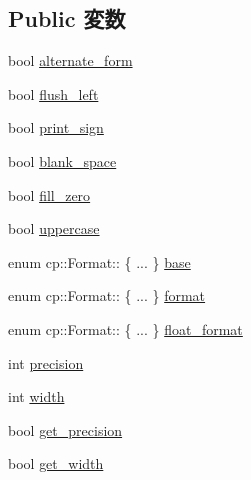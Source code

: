 \subsection*{Public 変数}
\begin{DoxyCompactItemize}
\item 
bool \hyperlink{structcp_1_1Format_a4accc3f9c261319d3776367892e23829}{alternate\_\-form}
\item 
bool \hyperlink{structcp_1_1Format_acc6845b4af267d8ecf7f301c3341ab97}{flush\_\-left}
\item 
bool \hyperlink{structcp_1_1Format_ab7c37fe3cbc5111a30a7b3c23f6cd95d}{print\_\-sign}
\item 
bool \hyperlink{structcp_1_1Format_ac62e0d7e7035e41d8b81591afc662090}{blank\_\-space}
\item 
bool \hyperlink{structcp_1_1Format_aea2b8a71b9111805920b036fc5b7f271}{fill\_\-zero}
\item 
bool \hyperlink{structcp_1_1Format_acf08089b3da2364267676e8d54503bb7}{uppercase}
\item 
enum cp::Format:: \{ ... \}  \hyperlink{structcp_1_1Format_a9a1f58abfd1ab6f831c3377b88ada6ac}{base}
\item 
enum cp::Format:: \{ ... \}  \hyperlink{structcp_1_1Format_a0499fd1abf3b3c756228b2ed6eeb5840}{format}
\item 
enum cp::Format:: \{ ... \}  \hyperlink{structcp_1_1Format_a684c0beba7b4d2c1840dd1ac8c725bd5}{float\_\-format}
\item 
int \hyperlink{structcp_1_1Format_aa95455ed52a8459fad69509a4a0411b5}{precision}
\item 
int \hyperlink{structcp_1_1Format_a2474a5474cbff19523a51eb1de01cda4}{width}
\item 
bool \hyperlink{structcp_1_1Format_a07210e0e22f31d7d77ea7133098fd3eb}{get\_\-precision}
\item 
bool \hyperlink{structcp_1_1Format_aaf454f3604113e3809d28d487b20db9c}{get\_\-width}
\end{DoxyCompactItemize}


